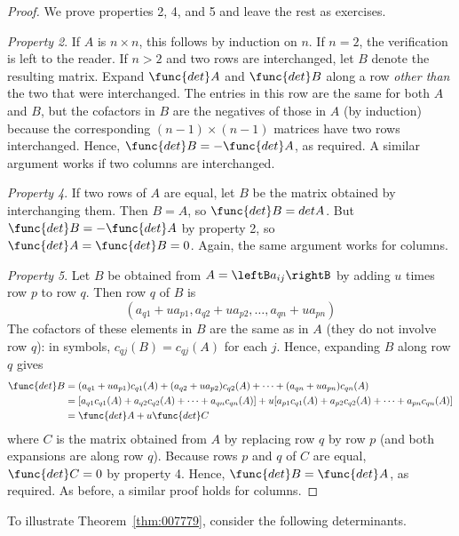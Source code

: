 \begin{proof}
We prove properties 2, 4, and 5 and leave the rest as exercises.

\textit{Property 2}. If $A$ is $n \times n$, this follows by induction on $n$. If $n = 2$, the verification is left to the reader. If $n > 2$ and two rows are interchanged, let $B$ denote the resulting matrix. Expand $\func{det } A$ and $\func{det } B$ along a row \textit{other than} the two that were interchanged. The entries in this row are the same for both $A$ and $B$, but the cofactors in $B$ are the negatives of those in $A$ (by induction) because the corresponding $(n - 1) \times (n - 1)$ matrices have two rows interchanged. Hence, $\func{det } B = - \func{det } A$, as required. A similar argument works if two columns are interchanged.


\textit{Property 4}. If two rows of $A$ are equal, let $B$ be the matrix obtained by interchanging them. Then $B = A$, so $\func{det } B = det A$. But $\func{det } B = -\func{det } A$ by property 2, so $\func{det } A = \func{det } B = 0$. Again, the same argument works for columns.


\textit{Property 5}. Let $B$ be obtained from $A = \leftB a_{ij}\rightB$ by adding $u$ times row $p$ to row $q$. Then row $q$ of $B$ is 
\begin{equation*}
(a_{q1} + ua_{p1},a_{q2} + ua_{p2}, \dots , a_{qn} + ua_{pn})
\end{equation*}
The cofactors of these elements in $B$ are the same as in $A$ (they do not involve row $q$): in symbols, $c_{qj}(B) = c_{qj}(A)$ for each $j$. Hence, expanding $B$ along row $q$ gives
\begin{align*}
\func{det } B &= (a_{q1} + ua_{p1})c_{q1}(A) + (a_{q2} + ua_{p2})c_{q2}(A) + \cdots + (a_{qn}+ua_{pn})c_{qn}(A) \\
&= [a_{q1}c_{q1}(A) + a_{q2}c_{q2}(A) + \cdots + a_{qn}c_{qn}(A)] + u[a_{p1}c_{q1}(A) + a_{p2}c_{q2}(A) + \cdots + a_{pn}c_{qn}(A)] \\
&= \func{det } A + u \func{det } C
\end{align*}
where $C$ is the matrix obtained from $A$ by replacing row $q$ by row $p$ (and both expansions are along row $q$). Because rows $p$ and $q$ of $C$ are equal, $\func{det } C = 0$ by property 4. Hence, $\func{det } B = \func{det } A$, as required. As before, a similar proof holds for columns.
\end{proof}

To illustrate Theorem~\ref{thm:007779}, consider the following determinants.


